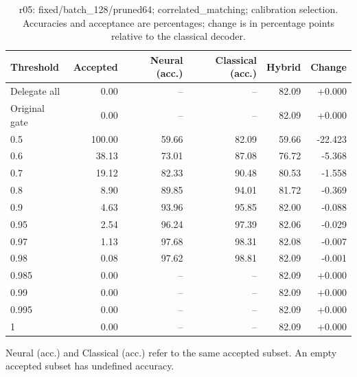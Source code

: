 \begin{table}[htbp]
\centering\small
\setlength{\tabcolsep}{3pt}
\caption{r05: fixed/batch\_128/pruned64; correlated\_matching; calibration selection. Accuracies and acceptance are percentages; change is in percentage points relative to the classical decoder.}
\begin{tabular}{lrrrrr}
\toprule
Threshold & Accepted & Neural (acc.) & Classical (acc.) & Hybrid & Change \\
\midrule
Delegate all & 0.00 & -- & -- & 82.09 & +0.000 \\
Original gate & 0.00 & -- & -- & 82.09 & +0.000 \\
0.5 & 100.00 & 59.66 & 82.09 & 59.66 & -22.423 \\
0.6 & 38.13 & 73.01 & 87.08 & 76.72 & -5.368 \\
0.7 & 19.12 & 82.33 & 90.48 & 80.53 & -1.558 \\
0.8 & 8.90 & 89.85 & 94.01 & 81.72 & -0.369 \\
0.9 & 4.63 & 93.96 & 95.85 & 82.00 & -0.088 \\
0.95 & 2.54 & 96.24 & 97.39 & 82.06 & -0.029 \\
0.97 & 1.13 & 97.68 & 98.31 & 82.08 & -0.007 \\
0.98 & 0.08 & 97.62 & 98.81 & 82.09 & -0.001 \\
0.985 & 0.00 & -- & -- & 82.09 & +0.000 \\
0.99 & 0.00 & -- & -- & 82.09 & +0.000 \\
0.995 & 0.00 & -- & -- & 82.09 & +0.000 \\
1 & 0.00 & -- & -- & 82.09 & +0.000 \\
\bottomrule
\end{tabular}
\par\smallskip\footnotesize Neural (acc.) and Classical (acc.) refer to the same accepted subset. An empty accepted subset has undefined accuracy.
\end{table}
